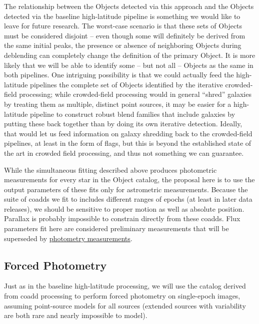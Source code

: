 \documentclass[DM,authoryear,toc]{lsstdoc}
\begin{document}
The relationship between the Objects detected via this approach and the Objects detected via the baseline high-latitude pipeline is something we would like to leave for future research.
The worst-case scenario is that these sets of Objects must be considered disjoint -- even though some will definitely be derived from the same initial peaks, the presence or absence of neighboring Objects during deblending can completely change the definition of the primary Object.
It is more likely that we will be able to identify some -- but not all -- Objects as the same in both pipelines.
One intriguing possibility is that we could actually feed the high-latitude pipelines the complete set of Objects identified by the iterative crowded-field processing; while crowded-field processing would in general ``shred'' galaxies by treating them as multiple, distinct point sources, it may be easier for a high-latitude pipeline to construct robust blend families that include galaxies by putting these back together than by doing its own iterative detection.
Ideally, that would let us feed information on galaxy shredding back to the crowded-field pipelines, at least in the form of flags, but this is beyond the established state of the art in crowded field processing, and thus not something we can guarantee.

While the simultaneous fitting described above produces photometric measurements for every star in the Object catalog, the proposal here is to use the output parameters of these fits only for astrometric measurements.
Because the suite of coadds we fit to includes different ranges of epochs (at least in later data releases), we should be sensitive to proper motion as well as absolute position.
Parallax is probably impossible to constrain directly from these coadds.
Flux parameters fit here are considered preliminary measurements that will be superseded by \hyperref[sec:forced-photometry]{photometry measurements}.

\subsection{Forced Photometry}
\label{sec:forced-photometry}

Just as in the baseline high-latitude processing, we will use the catalog derived from coadd processing to perform forced photometry on single-epoch images, assuming point-source models for all sources (extended sources with variability are both rare and nearly impossible to model).
\end{document}
